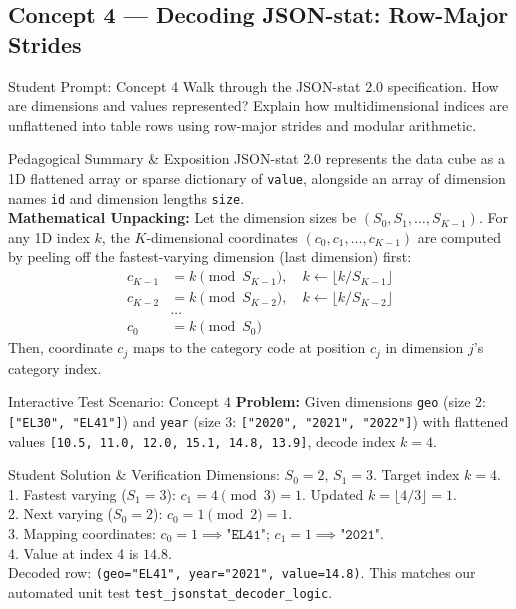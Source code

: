 \documentclass[11pt,a4paper]{article}
\begin{document}
\subsection{Concept 4 --- Decoding JSON-stat: Row-Major Strides}
\begin{promptbox}{Student Prompt: Concept 4}
Walk through the JSON-stat 2.0 specification. How are dimensions and values represented? Explain how multidimensional indices are unflattened into table rows using row-major strides and modular arithmetic.
\end{promptbox}

\begin{evalbox}{Pedagogical Summary \& Exposition}
JSON-stat 2.0 represents the data cube as a 1D flattened array or sparse dictionary of \texttt{value}, alongside an array of dimension names \texttt{id} and dimension lengths \texttt{size}.\\
\textbf{Mathematical Unpacking:}
Let the dimension sizes be $(S_0, S_1, \dots, S_{K-1})$. For any 1D index $k$, the $K$-dimensional coordinates $(c_0, c_1, \dots, c_{K-1})$ are computed by peeling off the fastest-varying dimension (last dimension) first:
\begin{align}
c_{K-1} &= k \pmod{S_{K-1}}, \quad k \leftarrow \lfloor k / S_{K-1} \rfloor \\
c_{K-2} &= k \pmod{S_{K-2}}, \quad k \leftarrow \lfloor k / S_{K-2} \rfloor \\
&\dots \\
c_0 &= k \pmod{S_0}
\end{align}
Then, coordinate $c_j$ maps to the category code at position $c_j$ in dimension $j$'s category index.
\end{evalbox}

\begin{testbox}{Interactive Test Scenario: Concept 4}
\textbf{Problem:} Given dimensions \texttt{geo} (size 2: \texttt{["EL30", "EL41"]}) and \texttt{year} (size 3: \texttt{["2020", "2021", "2022"]}) with flattened values \texttt{[10.5, 11.0, 12.0, 15.1, 14.8, 13.9]}, decode index $k = 4$.
\end{testbox}

\begin{evalbox}{Student Solution \& Verification}
Dimensions: $S_0 = 2$, $S_1 = 3$. Target index $k = 4$.\\
1. Fastest varying ($S_1 = 3$): $c_1 = 4 \pmod 3 = 1$. Updated $k = \lfloor 4 / 3 \rfloor = 1$.\\
2. Next varying ($S_0 = 2$): $c_0 = 1 \pmod 2 = 1$.\\
3. Mapping coordinates: $c_0 = 1 \implies \texttt{"EL41"}$; $c_1 = 1 \implies \texttt{"2021"}$.\\
4. Value at index 4 is $\mathbf{14.8}$.\\
Decoded row: \texttt{(geo="EL41", year="2021", value=14.8)}. This matches our automated unit test \texttt{test\_jsonstat\_decoder\_logic}.
\end{evalbox}
\end{document}
